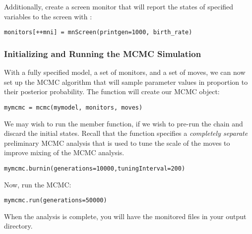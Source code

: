 Additionally, create a screen monitor that will report the states of specified variables to the screen with :
{\tt \begin{snugshade*}
\begin{lstlisting}
monitors[++mni] = mnScreen(printgen=1000, birth_rate)
\end{lstlisting}
\end{snugshade*}}

\subsubsection{Initializing and Running the MCMC Simulation}

With a fully specified model, a set of monitors, and a set of moves, we can now set up the MCMC algorithm that will sample parameter values in proportion to their posterior probability. The  function will create our MCMC object:
{\tt \begin{snugshade*}
\begin{lstlisting}
mymcmc = mcmc(mymodel, monitors, moves)
\end{lstlisting}
\end{snugshade*}}


We may wish to run the  member function, \IE if we wish to pre-run the chain and discard the initial states. 
Recall that the  function specifies a \textit{completely separate} preliminary MCMC analysis that is used to tune the scale of the moves to improve mixing of the MCMC analysis.
{\tt \begin{snugshade*}
\begin{lstlisting}
mymcmc.burnin(generations=10000,tuningInterval=200)
\end{lstlisting}
\end{snugshade*}}


Now, run the MCMC:
{\tt \begin{snugshade*}
\begin{lstlisting}
mymcmc.run(generations=50000)
\end{lstlisting}
\end{snugshade*}}

When the analysis is complete, you will have the monitored files in your output directory.



